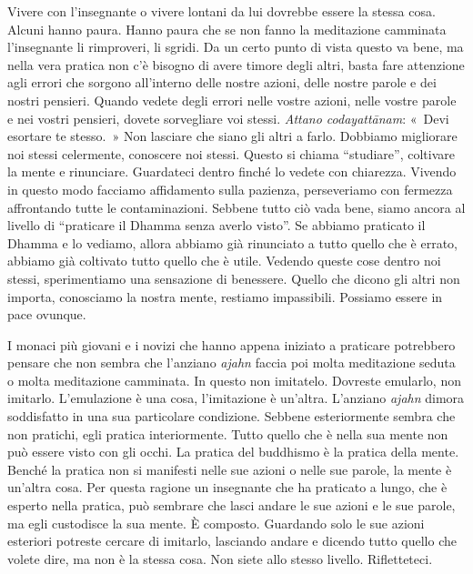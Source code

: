 Vivere con l'insegnante o vivere lontani da lui dovrebbe essere la
stessa cosa. Alcuni hanno paura. Hanno paura che se non fanno la
meditazione camminata l'insegnante li rimproveri, li sgridi. Da un certo
punto di vista questo va bene, ma nella vera pratica non c'è bisogno di
avere timore degli altri, basta fare attenzione agli errori che sorgono
all'interno delle nostre azioni, delle nostre parole e dei nostri
pensieri. Quando vedete degli errori nelle vostre azioni, nelle vostre
parole e nei vostri pensieri, dovete sorvegliare voi stessi.
\emph{Attano codayattānam}: «~Devi esortare te stesso.~» Non lasciare
che siano gli altri a farlo. Dobbiamo migliorare noi stessi celermente,
conoscere noi stessi. Questo si chiama ``studiare'', coltivare la mente
e rinunciare. Guardateci dentro finché lo vedete con chiarezza. Vivendo
in questo modo facciamo affidamento sulla pazienza, perseveriamo con
fermezza affrontando tutte le contaminazioni. Sebbene tutto ciò vada
bene, siamo ancora al livello di ``praticare il Dhamma senza averlo
visto''. Se abbiamo praticato il Dhamma e lo vediamo, allora abbiamo già
rinunciato a tutto quello che è errato, abbiamo già coltivato tutto
quello che è utile. Vedendo queste cose dentro noi stessi, sperimentiamo
una sensazione di benessere. Quello che dicono gli altri non importa,
conosciamo la nostra mente, restiamo impassibili. Possiamo essere in
pace ovunque.

I monaci più giovani e i novizi che hanno appena iniziato a praticare
potrebbero pensare che non sembra che l'anziano \emph{ajahn} faccia poi
molta meditazione seduta o molta meditazione camminata. In questo non
imitatelo. Dovreste emularlo, non imitarlo. L'emulazione è una cosa,
l'imitazione è un'altra. L'anziano \emph{ajahn} dimora soddisfatto in
una sua particolare condizione. Sebbene esteriormente sembra che non
pratichi, egli pratica interiormente. Tutto quello che è nella sua mente
non può essere visto con gli occhi. La pratica del buddhismo è la
pratica della mente. Benché la pratica non si manifesti nelle sue azioni
o nelle sue parole, la mente è un'altra cosa. Per questa ragione un
insegnante che ha praticato a lungo, che è esperto nella pratica, può
sembrare che lasci andare le sue azioni e le sue parole, ma egli
custodisce la sua mente. È composto. Guardando solo le sue azioni
esteriori potreste cercare di imitarlo, lasciando andare e dicendo tutto
quello che volete dire, ma non è la stessa cosa. Non siete allo stesso
livello. Rifletteteci.

